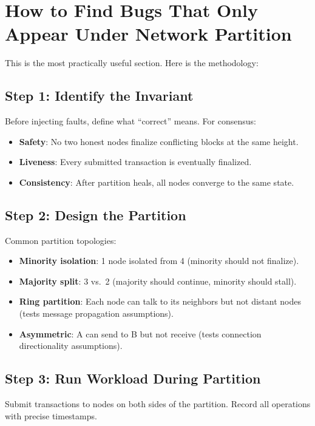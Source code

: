 \section{How to Find Bugs That Only Appear Under Network Partition}


This is the most practically useful section. Here is the methodology:

\subsection{Step 1: Identify the Invariant}

Before injecting faults, define what ``correct'' means. For consensus:
\begin{itemize}[nosep]
  \item \textbf{Safety}: No two honest nodes finalize conflicting blocks at the same height.
  \item \textbf{Liveness}: Every submitted transaction is eventually finalized.
  \item \textbf{Consistency}: After partition heals, all nodes converge to the same state.
\end{itemize}

\subsection{Step 2: Design the Partition}

Common partition topologies:
\begin{itemize}[nosep]
  \item \textbf{Minority isolation}: 1 node isolated from 4 (minority should not finalize).
  \item \textbf{Majority split}: 3 vs.\ 2 (majority should continue, minority should stall).
  \item \textbf{Ring partition}: Each node can talk to its neighbors but not distant nodes
    (tests message propagation assumptions).
  \item \textbf{Asymmetric}: A can send to B but not receive (tests connection
    directionality assumptions).
\end{itemize}

\subsection{Step 3: Run Workload During Partition}

Submit transactions to nodes on both sides of the partition. Record all operations with
precise timestamps.

